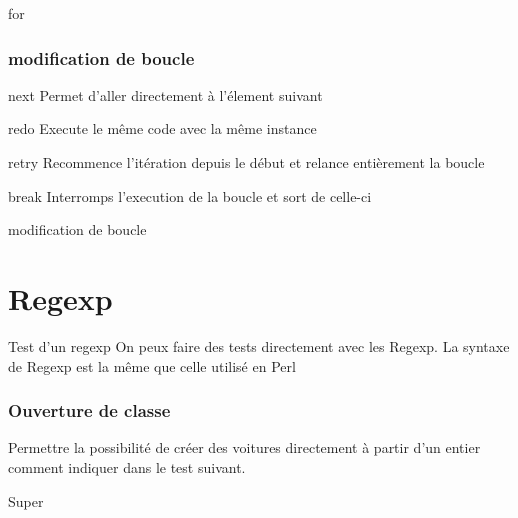 \documentclass{beamer}
\begin{document}
\begin{frame}
  \begin{block}{for}
    
  \end{block}
\end{frame}

\begin{frame}
  \frametitle{modification de boucle}
  \begin{block}{next}
    Permet d'aller directement à l'\'element suivant
  \end{block}
  \begin{block}{redo}
    Execute le même code avec la même instance
  \end{block}
  \begin{block}{retry}
    Recommence l'it\'eration depuis le d\'ebut et relance entièrement la boucle
  \end{block}
  \begin{block}{break}
    Interromps l'execution de la boucle et sort de celle-ci
  \end{block}
\end{frame}

\begin{frame}
  \begin{block}{modification de boucle}
    
  \end{block}
\end{frame}

\section{Regexp}

\begin{frame}
  \begin{block}{Test d'un regexp}
    On peux faire des tests directement avec les Regexp. La syntaxe de Regexp est la même que celle
    utilis\'e en Perl
  \end{block}
\end{frame}

\begin{frame}
  \frametitle{Ouverture de classe}
  Permettre la possibilit\'e de cr\'eer des voitures directement à partir d'un entier comment indiquer dans le test suivant.
\end{frame}
\begin{frame}
  \begin{beamerboxesrounded}{Super}
    
  \end{beamerboxesrounded}
\end{frame}
\end{document}

